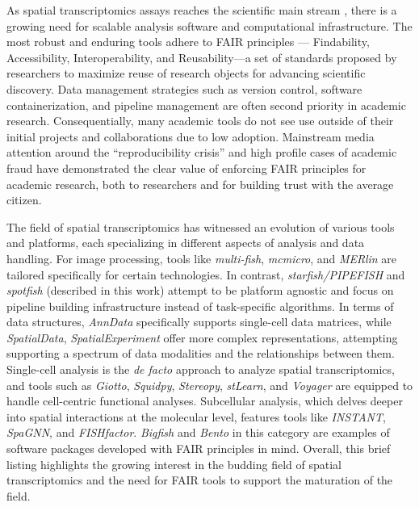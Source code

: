 \begin{dissertationintroduction}
As spatial transcriptomics assays reaches the scientific main stream \cite{marxMethodYearSpatially2021}, there is a growing need for scalable analysis software and computational infrastructure. The most robust and enduring tools adhere to FAIR principles\cite{wilkinsonFAIRGuidingPrinciples2016} — Findability, Accessibility, Interoperability, and Reusability—a set of standards proposed by researchers to maximize reuse of research objects for advancing scientific discovery. Data management strategies such as version control, software containerization, and pipeline management are often second priority in academic research. Consequentially, many academic tools do not see use outside of their initial projects and collaborations due to low adoption. Mainstream media attention around the “reproducibility crisis” and high profile cases of academic fraud have demonstrated the clear value of enforcing FAIR principles for academic research, both to researchers and for building trust with the average citizen. 

The field of spatial transcriptomics has witnessed an evolution of various tools and platforms, each specializing in different aspects of analysis and data handling. For image processing, tools like \textit{multi-fish}\cite{wangEASIFISHThickTissue2021}, \textit{mcmicro}\cite{schapiroMCMICROScalableModular2022}, and \textit{MERlin}\cite{ZhuangLabMERlinMERlin} are tailored specifically for certain technologies. In contrast, \textit{starfish/PIPEFISH}\cite{othersStarfishOpenSource,cisarUnifiedPipelineFISH2023} and \textit{spotfish} (described in this work) attempt to be platform agnostic and focus on pipeline building infrastructure instead of task-specific algorithms. In terms of data structures, \textit{AnnData}\cite{virshupAnndataAnnotatedData2021} specifically supports single-cell data matrices, while \textit{SpatialData}\cite{marconatoSpatialDataOpenUniversal2023}, \textit{SpatialExperiment}\cite{righelliSpatialExperimentInfrastructureSpatiallyresolved2022} offer more complex representations, attempting supporting a spectrum of data modalities and the relationships between them. Single-cell analysis is the \textit{de facto} approach to analyze spatial transcriptomics, and tools such as \textit{Giotto}\cite{driesGiottoToolboxIntegrative2021}, \textit{Squidpy}\cite{pallaSquidpyScalableFramework2021}, \textit{Stereopy}\cite{STOmicsStereopy2023}, \textit{stLearn}\cite{phamStLearnIntegratingSpatial2020}, and \textit{Voyager}\cite{mosesVoyagerExploratorySinglecell2023} are equipped to handle cell-centric functional analyses. Subcellular analysis, which delves deeper into spatial interactions at the molecular level, features tools like \textit{INSTANT}\cite{kumarIntracellularSpatialTranscriptomic2023}, \textit{SpaGNN}\cite{fangSubcellularSpatiallyResolved}, and \textit{FISHfactor}\cite{walterFISHFactorProbabilisticFactor}. \textit{Bigfish}\cite{imbertFISHquantV2Scalable2022} and \textit{Bento}\cite{mahBentoToolkitSubcellular2022} in this category are examples of software packages developed with FAIR principles in mind. Overall, this brief listing highlights the growing interest in the budding field of spatial transcriptomics and the need for FAIR tools to support the maturation of the field.



\end{dissertationintroduction}
